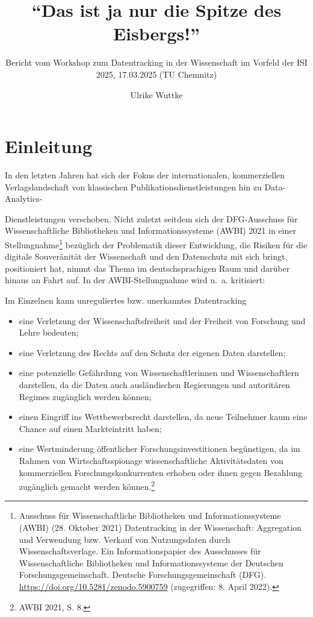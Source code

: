 \documentclass[a4paper,
fontsize=11pt,
oneside,
numbers=noperiodatend,
parskip=half-,
bibliography=totoc,
final
]{scrartcl}
\title{\LARGE{\enquote{Das ist ja nur die Spitze des Eisbergs!}}}
\subtitle{Bericht vom Workshop zum Datentracking in der Wissenschaft im Vorfeld der ISI 2025, 17.03.2025 (TU Chemnitz)}%
\author{Ulrike Wuttke} %
\date{}
\begin{document}
\maketitle
\thispagestyle{fancyplain} 


\section{Einleitung}\label{einleitung}

In den letzten Jahren hat sich der Fokus der internationalen,
kommerziellen Verlagslandschaft von klassischen
Publikationsdienstleistungen hin zu Data-Analytics-

Dienstleistungen verschoben. Nicht zuletzt seitdem sich der
DFG-Ausschuss für Wissenschaftliche Bibliotheken und Informationssysteme
(AWBI) 2021 in einer Stellungnahme\footnote{Ausschuss für
  Wissenschaftliche Bibliotheken und Informationssysteme (AWBI) (28.
  Oktober 2021) Datentracking in der Wissenschaft: Aggregation und
  Verwendung bzw. Verkauf von Nutzungsdaten durch Wissenschaftsverlage.
  Ein Informationspapier des Ausschusses für Wissenschaftliche
  Bibliotheken und Informationssysteme der Deutschen
  Forschungsgemeinschaft. Deutsche Forschungsgemeinschaft (DFG).
  \url{https://doi.org/10.5281/zenodo.5900759} (zugegriffen: 8. April
  2022).} bezüglich der Problematik dieser Entwicklung, die Risiken für
die digitale Souveränität der Wissenschaft und den Datenschutz mit sich
bringt, positioniert hat, nimmt das Thema im deutschsprachigen Raum und
darüber hinaus an Fahrt auf. In der AWBI-Stellungnahme wird u.~a.
kritisiert:

 \glqq Im Einzelnen kann unreguliertes bzw. unerkanntes Datentracking
\begin{itemize}
\item eine Verletzung der Wissenschaftsfreiheit und der Freiheit von Forschung und Lehre bedeuten; 
\item eine Verletzung des Rechts auf den Schutz der eigenen Daten darstellen; 
\item eine potenzielle Gefährdung von Wissenschaftlerinnen und Wissenschaftlern darstellen, da die Daten auch
ausländischen Regierungen und autoritären Regimes zugänglich werden können; 
\item einen Eingriff ins Wettbewerbsrecht darstellen, da neue Teilnehmer kaum eine Chance auf einen Markteintritt haben; 
\item eine Wertminderung öffentlicher Forschungsinvestitionen begünstigen, da im Rahmen von Wirtschaftsspionage wissenschaftliche Aktivitätsdaten von kommerziellen Forschungskonkurrenten erhoben oder ihnen gegen Bezahlung zugänglich gemacht werden können.\grqq \footnote{AWBI 2021, S. 8.}
\end{itemize}
\end{document}
